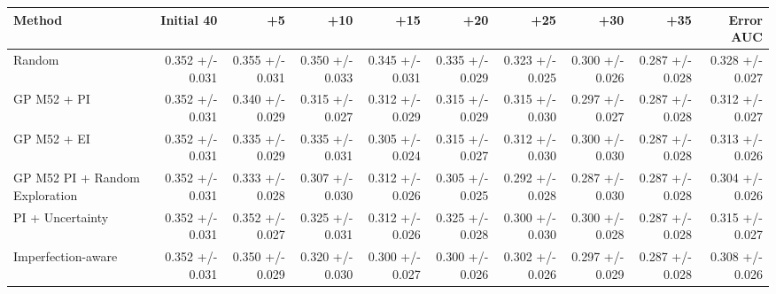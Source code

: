 \begin{tabular}{lrrrrrrrrr}
\toprule
Method & Initial 40 & +5 & +10 & +15 & +20 & +25 & +30 & +35 & Error AUC \\
\midrule
Random & 0.352 +/- 0.031 & 0.355 +/- 0.031 & 0.350 +/- 0.033 & 0.345 +/- 0.031 & 0.335 +/- 0.029 & 0.323 +/- 0.025 & 0.300 +/- 0.026 & 0.287 +/- 0.028 & 0.328 +/- 0.027 \\
GP M52 + PI & 0.352 +/- 0.031 & 0.340 +/- 0.029 & 0.315 +/- 0.027 & 0.312 +/- 0.029 & 0.315 +/- 0.029 & 0.315 +/- 0.030 & 0.297 +/- 0.027 & 0.287 +/- 0.028 & 0.312 +/- 0.027 \\
GP M52 + EI & 0.352 +/- 0.031 & 0.335 +/- 0.029 & 0.335 +/- 0.031 & 0.305 +/- 0.024 & 0.315 +/- 0.027 & 0.312 +/- 0.030 & 0.300 +/- 0.030 & 0.287 +/- 0.028 & 0.313 +/- 0.026 \\
GP M52 PI + Random Exploration & 0.352 +/- 0.031 & 0.333 +/- 0.028 & 0.307 +/- 0.030 & 0.312 +/- 0.026 & 0.305 +/- 0.025 & 0.292 +/- 0.028 & 0.287 +/- 0.030 & 0.287 +/- 0.028 & 0.304 +/- 0.026 \\
PI + Uncertainty & 0.352 +/- 0.031 & 0.352 +/- 0.027 & 0.325 +/- 0.031 & 0.312 +/- 0.026 & 0.325 +/- 0.028 & 0.300 +/- 0.030 & 0.300 +/- 0.028 & 0.287 +/- 0.028 & 0.315 +/- 0.027 \\
Imperfection-aware & 0.352 +/- 0.031 & 0.350 +/- 0.029 & 0.320 +/- 0.030 & 0.300 +/- 0.027 & 0.300 +/- 0.026 & 0.302 +/- 0.026 & 0.297 +/- 0.029 & 0.287 +/- 0.028 & 0.308 +/- 0.026 \\
\bottomrule
\end{tabular}
